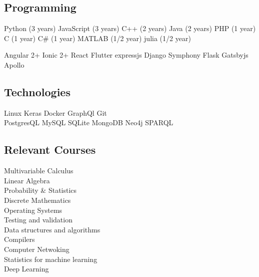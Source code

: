 \documentclass[]{deedy-resume-openfont}
\begin{document}
\begin{minipage}[t]{0.33\textwidth}
\subsection{Programming}
Python (3 years) \textbullet{} JavaScript (3 years) \textbullet{} C++ (2 years) \textbullet{} Java (2 years) \textbullet{} PHP (1 year) \textbullet{} C (1 year) \textbullet{} C\# (1 year) \textbullet{} MATLAB (1/2 year) \textbullet{} julia (1/2 year)\\

\hfill

Angular 2+ \textbullet{} Ionic 2+ \textbullet{} React \textbullet{} Flutter \textbullet{} expressjs \textbullet{} Django \textbullet{} Symphony  \textbullet{} Flask \textbullet{} Gatsbyjs \textbullet{} \\ Apollo\\

\hfill 
\hfill 

\subsection{Technologies}
Linux \textbullet{} Keras \textbullet{} Docker \textbullet{} GraphQl \textbullet{} Git\\
PostgresQL \textbullet{} MySQL \textbullet{} SQLite \textbullet{} MongoDB  \textbullet{} Neo4j \textbullet{} SPARQL\\

\hfill 
\hfill 

\subsection{Relevant Courses}
Multivariable Calculus\\
Linear Algebra\\
Probability \& Statistics \\
Discrete Mathematics\\
Operating Systems\\ 
Testing and validation\\
Data structures and algorithms\\
Compilers\\
Computer Netwoking\\
Statistics for machine learning\\
Deep Learning\\

%
%

\end{minipage}
\end{document}
